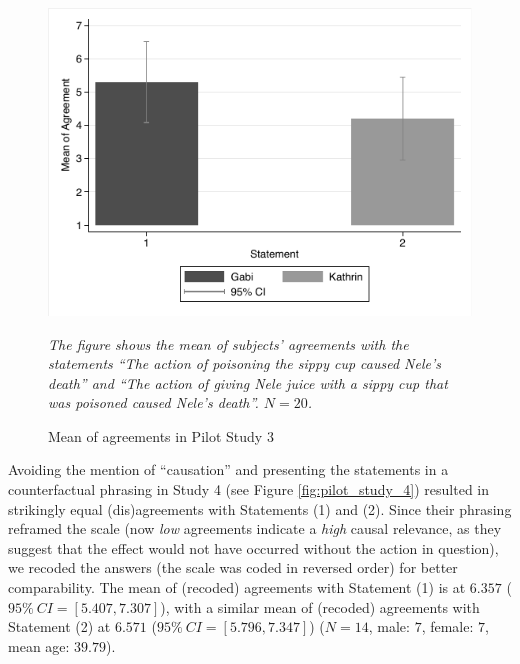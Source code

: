 \documentclass[egregdoesnotlikesansseriftitles,12pt]{scrartcl}
\begin{document}
\begin{figure}[H]
   \centering
   \includegraphics[scale=0.8]{figures/pilot_study_3.pdf}
   \begin{minipage}{0.9\linewidth}
   \footnotesize
   \emph{The figure shows the mean of subjects' agreements with the statements ``The action of poisoning the sippy cup caused Nele's death'' and ``The action of giving Nele juice with a sippy cup that was poisoned caused Nele's death''. $N=20$.}
   \end{minipage}
   \caption{Mean of agreements in Pilot Study 3}
   \label{fig:pilot_pilot_3}
\end{figure}

\noindent Avoiding the mention of ``causation'' and presenting the statements in a counterfactual phrasing in Study 4 (see Figure \ref{fig:pilot_study_4}) resulted in strikingly equal (dis)agreements with Statements (1) and (2). Since their phrasing reframed the scale (now \textit{low} agreements indicate a \textit{high} causal relevance, as they suggest that the effect would not have occurred without the action in question), we recoded the answers (the scale was coded in reversed order) for better comparability. The mean of (recoded) agreements with Statement (1) is at $6.357$ ($95\%~CI=[5.407,7.307]$), with a similar mean of (recoded) agreements with Statement (2) at $6.571$ ($95\%~CI=[5.796,7.347]$) ($N=14$, male: $7$, female: $7$, mean age: $39.79$).
\end{document}
